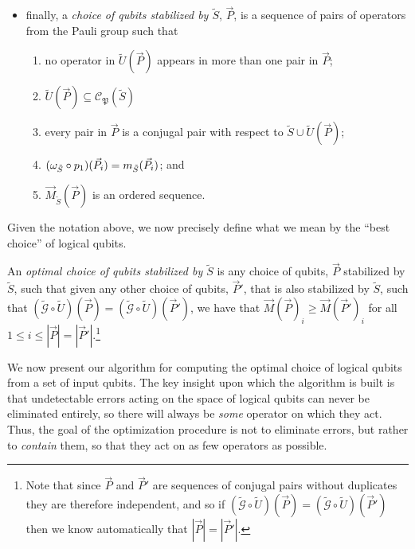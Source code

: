 \documentclass[twocolumn,showpacs,preprintnumbers,amsmath,amssymb,nofootinbib,pra,floatfix]{revtex4-1}
\newenvironment{definition}[1][Definition]{\begin{trivlist}
\item[\hskip \labelsep {\bfseries #1}]}{\end{trivlist}}
\newcommand{\lst}{\vec}
\newcommand{\set}{\tilde}
\newcommand{\genfun}{\tilde{\mathcal{G}}}
\newcommand{\pauligroup}{\mathfrak{P}}
\newcommand{\centralizer}{\mathcal{C}}
\begin{document}
\begin{definition}
\begin{itemize}
\item finally, a \emph{choice of qubits stabilized by $\set S$}, $\lst P$, is a sequence of pairs of operators from the Pauli group such that 
\begin{enumerate}
\item no operator in $\set U(\lst P)$ appears in more than one pair in $\lst P$;
\item $\set U(\lst P)\subseteq \centralizer_\pauligroup(\set S)$
\item every pair in $\lst P$ is a conjugal pair with respect to $\set S \cup \set U(\lst P)$;
\item $(\om_{\set S}\circ p_1)(\lst P_i)=m_{\set S}(\lst P_i)$; and
\item $\lst M_{\set S}(\lst P)$ is an ordered sequence.
\end{enumerate}
\end{itemize}

\end{definition}
Given the notation above, we now precisely define what we mean by the ``best choice'' of logical qubits.

\begin{definition}
An \emph{optimal choice of qubits stabilized by $\set S$} is any choice of qubits, $\lst P$ stabilized by $\set S$, such that given any other choice of qubits, $\lst P'$, that is also stabilized by $\set S$, such that $(\genfun\circ \set U)(\lst P)=(\genfun\circ \set U)(\lst P')$, we have that $\lst M(\lst P)_i \ge \lst M(\lst P')_i$ for all $1\le i \le |\lst P|=|\lst P'|$.\footnote{Note that since $\lst P$ and $\lst P'$ are sequences of conjugal pairs without duplicates they are therefore independent, and so if $(\genfun\circ \set U)(\lst P)=(\genfun\circ \set U)(\lst P')$ then we know automatically that $|\lst P|=|\lst P'|$.}
\end{definition}
We now present our algorithm for computing the optimal choice of logical qubits from a set of input qubits.  The key insight upon which the algorithm is built is that undetectable errors acting on the space of logical qubits can never be eliminated entirely, so there will always be \emph{some} operator on which they act.  Thus, the goal of the optimization procedure is not to eliminate errors, but rather to \emph{contain} them, so that they act on as few operators as possible.
\end{document}
